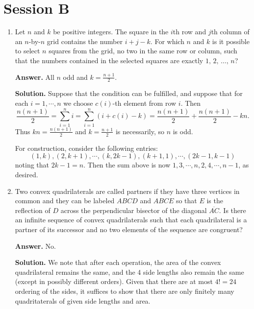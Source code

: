 \documentclass[11pt,a4paper]{article}
\begin{document}
    \section*{Session B}
    
    \begin{enumerate}
    	\item [B1.] 
    	Let $n$ and $k$ be positive integers. The square in the $i$th row and $j$th column of an $n$-by-$n$ grid contains the number $i+j-k$. For which $n$ and $k$ is it possible to select $n$ squares from the grid, no two in the same row or column, such that the numbers contained in the selected squares are exactly $1,\,2,\,\ldots,\,n$?
    	
    	\textbf{Answer.} 
    	All $n$ odd and $k = \frac{n + 1}{2}$. 
    	
    	\textbf{Solution.} 
    	Suppose that the condition can be fulfilled, 
    	and suppose that for each $i = 1, \cdots, n$ we choose $c(i)$-th element from row $i$. 
    	Then 
    	\[\frac{n(n+1)}{2} = \sum_{i=1}^n i = \sum_{i=1}^n (i + c(i) - k) = \frac{n(n+1)}{2}  + \frac{n(n+1)}{2}  - kn.
    	\]
    	Thus $kn = \frac{n(n+1)}{2}$ and $k = \frac{n + 1}{2}$ is necessarily, 
    	so $n$ is odd. 
    	
    	For construction, consider the following entries: 
    	\[
    	(1, k), (2, k + 1), \cdots, (k, 2k - 1), (k + 1, 1), \cdots, (2k - 1, k - 1)
    	\]
    	noting that $2k - 1 = n$. 
    	Then the sum above is now $1, 3, \cdots, n, 2, 4, \cdots, n - 1$, as desired. 
    	
    	\item [B2.] 
    	Two convex quadrilaterals are called partners if they have three vertices in common and they can be labeled $ABCD$ and $ABCE$ so that $E$ is the reflection of $D$ across the perpendicular bisector of the diagonal $\overline{AC}$. Is there an infinite sequence of convex quadrilaterals such that each quadrilateral is a partner of its successor and no two elements of the sequence are congruent?
    	
    	\textbf{Answer.} No. 
    	
    	\textbf{Solution.} 
    	We note that after each operation, the area of the convex quadrilateral remains the same, 
    	and the 4 side lengths also remain the same (except in possibly different orders). 
    	Given that there are at most $4!=24$ ordering of the sides, 
    	it suffices to show that there are only finitely many quadritaterals of given side lengths and area. 
    	

\end{enumerate}
\end{document}

